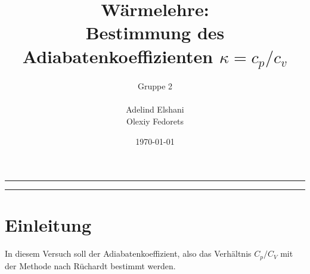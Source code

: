 \documentclass[a4paper, 11pt]{article}
\title{Wärmelehre: \\ Bestimmung des Adiabatenkoeffizienten $\kappa = c_p / c_v$}
\author{Gruppe 2 \\ \\ Adelind Elshani \\ Olexiy Fedorets}
\date{\today}
\begin{document}
\begin{titlepage}
	\vspace*{\fill}
	\begin{center}
		\textheight
		\vfill
		\newcommand{\Line}{\rule{\linewidth}{0.6mm}}
		\Line 
		{\let\newpage\relax\maketitle}
		\Line 
		\vfill
	\end{center}
	\vspace*{\fill}
	\thispagestyle{empty}
\end{titlepage}





\newpage
\thispagestyle{empty}
\tableofcontents
\newpage

\pagestyle{fancy}
\fancyhf{}
\fancyhead[L]{\nouppercase{\leftmark}}
\fancyhead[R]{\thepage}
\renewcommand{\headrulewidth}{0.5pt}
\fancyfoot[C]{\thepage}


\setcounter{page}{1}

\section{Einleitung}
In diesem Versuch soll der Adiabatenkoeffizient, also das Verhältnis $C_p/C_V$ mit der Methode nach Rüchardt bestimmt werden.
\end{document}
